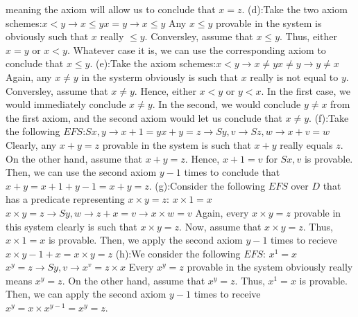 \documentclass{article}
\theoremstyle{definition}
\begin{document}
meaning the axiom will allow us to conclude that $x=z$.\newline
(d):\newline Take the two axiom schemes:\newline $x<y\rightarrow x\le y$\newline $x=y\rightarrow x\le y$\newline
Any $x\le y$ provable in the system is obviously such that $x$ really $\le y$. Conversley, assume that $x\le y$. Thus, either $x=y$ or $x<y$. Whatever case 
it is, we can use the corresponding axiom to conclude that $x\le y$.\newline
(e):\newline Take the axiom schemes:\newline $x<y\rightarrow x\ne y$\newline $x\ne y\rightarrow y\ne x$
\newline Again, any $x\ne y$ in the systerm obviously is such that $x$ really is not equal to $y$. Conversley, assume that $x\ne y$. Hence, either $x<y$ or 
$y<x$. In the first case, we would immediately conclude $x\ne y$. In the second, we would conclude $y\ne x$ from the first axiom, and the second axiom would 
let us conclude that $x\ne y$.\newline
(f):\newline Take the following $EFS$:\newline $Sx,y\rightarrow x+1=y
$\newline $x+y=z\rightarrow Sy,v\rightarrow Sz,w\rightarrow x+v=w$\newline
Clearly, any $x+y=z$ provable in the system is such that $x+y$ really equals $z$. On the other hand, assume that $x+y=z$. Hence, $x+1=v$ for $Sx,v$ is 
provable. Then, we can use the second axiom $y-1$ times to conclude that $x+y=x+1+y-1=x+y=z$.\newline 
(g):\newline Consider the following $EFS$ over $D$ that has a predicate representing $x\times y=z$:\newline
$x\times 1=x$\newline $x\times y=z\rightarrow Sy,w\rightarrow z+x=v\rightarrow x\times w=v$\newline
Again, every $x\times y=z$ provable in this system clearly is such that $x\times y=z$. Now, assume that $x\times y=z$. Thus, $x\times 1=x$ is provable. Then,
 we apply the second axiom $y-1$ times to recieve $x\times y-1+x=x\times y=z$\newline
(h):\newline We consider the following $EFS$:\newline
$x^1=x$\newline $x^y=z\rightarrow Sy,v\rightarrow x^v=z\times x$\newline	
Every $x^y=z$ provable in the system obviously really means $x^y=z$. On the other hand, assume that $x^y=z$. Thus, $x^1=x$ is provable. Then, we can apply 
the second axiom $y-1$ times to receive $x^y=x\times x^{y-1}=x^y=z$.\newline
\end{document}
